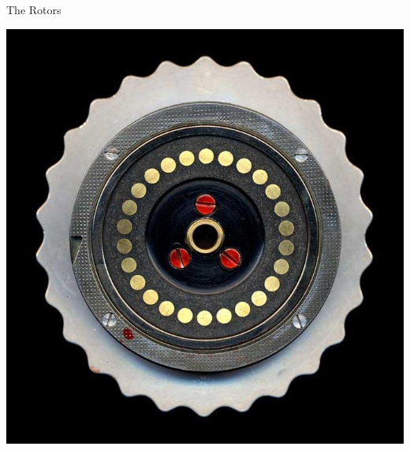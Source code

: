 \documentclass[hyphens,aspectratio=169]{beamer}
\begin{document}
\begin{frame}[fragile]{The Rotors}
\begin{center}
{\begin{minipage}{0.48\textwidth}
				\vspace{4mm} %
				\includegraphics[width=0.8\linewidth]{paper/images/exit.jpg}
			\end{minipage}
		}
	\end{center}
\end{frame}
\end{document}
